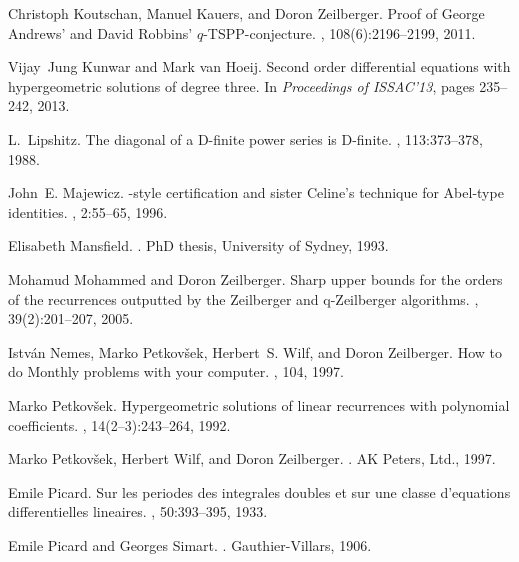 \documentclass{jssc}
\begin{document}
\begin{thebibliography}{199}
Christoph Koutschan, Manuel Kauers, and Doron Zeilberger.
\newblock Proof of {G}eorge {A}ndrews' and {D}avid {R}obbins'
  $q$-{TSPP}-conjecture.
,
  108(6):2196--2199, 2011.

Vijay~Jung Kunwar and Mark van Hoeij.
\newblock Second order differential equations with hypergeometric solutions of
  degree three.
\newblock In {\em Proceedings of ISSAC'13}, pages 235--242, 2013.

L.~Lipshitz.
\newblock The diagonal of a {D}-finite power series is {D}-finite.
, 113:373--378, 1988.

John~E. Majewicz.
-style certification and sister {C}eline's technique for
  {A}bel-type identities.
, 2:55--65, 1996.

Elisabeth Mansfield.
.
\newblock PhD thesis, University of Sydney, 1993.

Mohamud Mohammed and Doron Zeilberger.
\newblock Sharp upper bounds for the orders of the recurrences outputted by the
  {Z}eilberger and q-{Z}eilberger algorithms.
, 39(2):201--207, 2005.

Istv{\'a}n Nemes, Marko Petkov{\v s}ek, Herbert~S. Wilf, and Doron Zeilberger.
\newblock How to do {M}onthly problems with your computer.
, 104, 1997.

Marko Petkov{\v s}ek.
\newblock Hypergeometric solutions of linear recurrences with polynomial
  coefficients.
, 14(2--3):243--264, 1992.

Marko Petkov{\v s}ek, Herbert Wilf, and Doron Zeilberger.
.
\newblock AK Peters, Ltd., 1997.

Emile Picard.
\newblock Sur les periodes des integrales doubles et sur une classe d'equations
  differentielles lineaires.
, 50:393--395, 1933.

Emile Picard and Georges Simart.
.
\newblock Gauthier-Villars, 1906.


\end{thebibliography}
\end{document}
